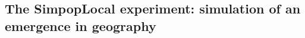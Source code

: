 \documentclass[10pt]{article}
\begin{document}
\subsection{The SimpopLocal experiment: simulation of an emergence in geography}


\end{document}
